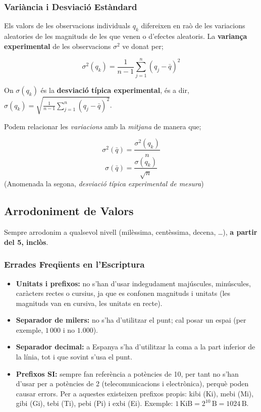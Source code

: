 \documentclass[12pt]{article}
\begin{document}
\subsubsection{Variància i Desviació Estàndard}

Els valors de les observacions individuals $q_k$ difereixen en raò de les variacions aleatories de les magnituds de les que venen o d'efectes aleatoris. La \textbf{variança experimental} de les observacions $\sigma^2$ ve donat per;

\[\sigma^2(q_k) = \frac{1}{n-1} \sum_{j = 1}^{n} (q_j - \bar{q})^2\]

On $\sigma(q_k)$ és la \textbf{desviació típica experimental}, és a dir, $\sigma(q_k) = \sqrt{\frac{1}{n-1} \sum_{j = 1}^{n} (q_j - \bar{q})^2}$.

Podem relacionar les \textit{variacions} amb la \textit{mitjana} de manera que;

\[\sigma^2(\bar{q}) = \frac{\sigma^2(q_k)}{n}\]
\[\sigma(\bar{q}) = \frac{\sigma(q_k)}{\sqrt{n}}\] (Anomenada la segona, \textit{desviació típica experimental de mesura})


\subsection{Arrodoniment de Valors}

Sempre arrodonim a qualsevol nivell (milèssima, centèssima, decena, \dots), \textbf{a partir del 5, inclòs}.

\subsubsection{Errades Freqüents en l'Escriptura}

\begin{itemize}
  \item \textbf{Unitats i prefixos:} no s'han d'usar indegudament majúscules, minúscules, caràcters rectes o cursius, ja que es confonen magnituds i unitats (les magnituds van en cursiva, les unitats en recte).
  \item \textbf{Separador de milers:} no s'ha d'utilitzar el punt; cal posar un espai (per exemple, $1\,000$ i no $1.000$).
  \item \textbf{Separador decimal:} a Espanya s'ha d'utilitzar la coma a la part inferior de la línia, tot i que sovint s'usa el punt.
  \item \textbf{Prefixos SI:} sempre fan referència a potències de 10, per tant no s'han d'usar per a potències de 2 (telecomunicacions i electrònica), perquè poden causar errors. Per a aquestes existeixen prefixos propis: kibi (Ki), mebi (Mi), gibi (Gi), tebi (Ti), pebi (Pi) i exbi (Ei). Exemple: $1\,\mathrm{KiB} = 2^{10}\,\mathrm{B} = 1024\,\mathrm{B}$.
\end{itemize}
\end{document}
